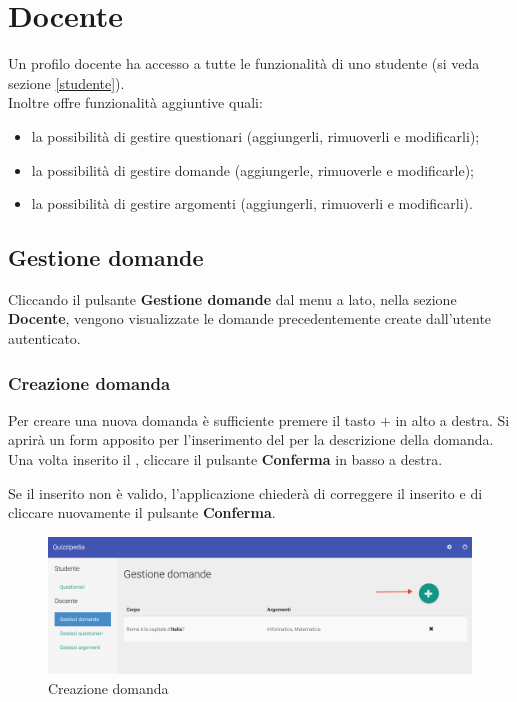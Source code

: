 \documentclass[12pt,a4paper]{article}
\begin{document}
	\section{Docente}\label{docente}
	Un profilo docente ha accesso a tutte le funzionalità di uno studente (si veda sezione \ref{studente}). \\
		Inoltre offre funzionalità aggiuntive quali:
		\begin{itemize}
			\item la possibilità di gestire questionari (aggiungerli, rimuoverli e modificarli);
			\item la possibilità di gestire domande (aggiungerle, rimuoverle e modificarle);
			\item la possibilità di gestire argomenti (aggiungerli, rimuoverli e modificarli).
		\end{itemize}
	
    \subsection{Gestione domande}

    Cliccando il pulsante \textbf{Gestione domande} dal menu a lato, nella sezione \textbf{Docente}, vengono visualizzate le domande precedentemente create dall'utente autenticato. 
    
	\subsubsection{Creazione domanda}
	Per creare una nuova domanda è sufficiente premere il tasto $\boldsymbol{+}$ in alto a destra. Si aprirà un form apposito per l'inserimento del  per la descrizione della domanda. Una volta inserito il , cliccare il pulsante \textbf{Conferma} in basso a destra.
	
	Se il  inserito non è valido, l'applicazione chiederà di correggere il  inserito e di cliccare nuovamente il pulsante \textbf{Conferma}.
	
		\begin{figure}[H]	
			\centering
			\includegraphics[width=1\linewidth]{../img/screenshot/creazioneDomanda.png}
			\caption{Creazione domanda}
			\label{Creazione domanda}
		\end{figure}
	
\end{document}

